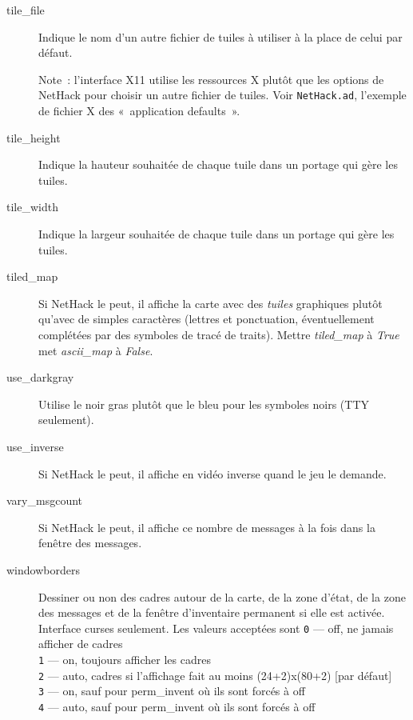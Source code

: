 \documentclass[titlepage]{article}
\begin{document}
\begin{description}
\item[{tile\_file}]
Indique le nom d'un autre fichier de tuiles à utiliser à la place de celui
par défaut.


Note~: l'interface X11 utilise les ressources X plutôt que les options de
NetHack pour choisir un autre fichier de tuiles.
Voir \texttt{NetHack.ad}, l'exemple de fichier X des «~application
defaults~».

\item[{tile\_height}]
Indique la hauteur souhaitée de chaque tuile dans un portage qui gère les
tuiles.

\item[{tile\_width}]
Indique la largeur souhaitée de chaque tuile dans un portage qui gère les
tuiles.

\item[{tiled\_map}]
Si NetHack le peut, il affiche la carte avec des \textit{tuiles} graphiques
plutôt qu'avec de simples caractères (lettres et ponctuation, éventuellement
complétées par des symboles de tracé de traits).
Mettre
\textit{tiled\_map}
à \textit{True} met
\textit{ascii\_map}
à \textit{False}.

\item[{use\_darkgray}]
Utilise le noir gras plutôt que le bleu pour les symboles noirs (TTY
seulement).

\item[{use\_inverse}]
Si NetHack le peut, il affiche en vidéo inverse quand le jeu le demande.

\item[{vary\_msgcount}]
Si NetHack le peut, il affiche ce nombre de messages à la fois dans la
fenêtre des messages.

\item[{windowborders}]
Dessiner ou non des cadres autour de la carte, de la zone d'état, de la
zone des messages et de la fenêtre d'inventaire permanent si elle est
activée.
Interface curses seulement.
Les valeurs acceptées sont
\texttt{0} --- off, ne jamais afficher de cadres\\
\texttt{1} --- on, toujours afficher les cadres\\
\texttt{2} --- auto, cadres si l'affichage fait au moins (24+2)x(80+2) [par défaut]\\
\texttt{3} --- on, sauf pour perm\_invent où ils sont forcés à off\\
\texttt{4} --- auto, sauf pour perm\_invent où ils sont forcés à off\\



\end{description}
\end{document}
